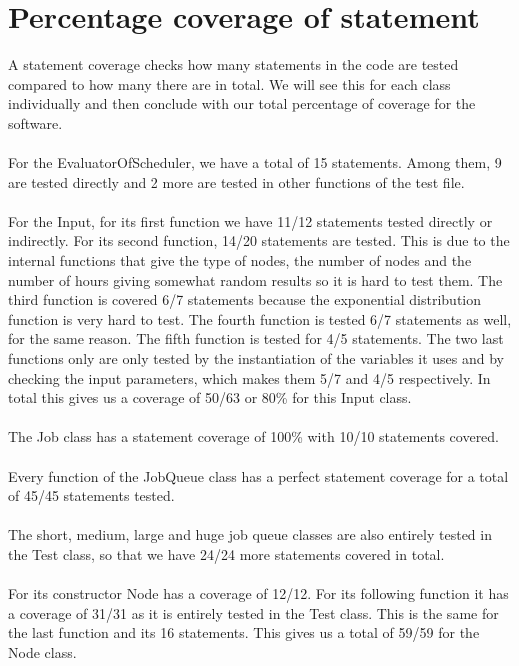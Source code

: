 \documentclass [10 pt, a4 paper]{report}
\begin{document}
\section{Percentage coverage of statement}

A statement coverage checks how many statements in the code are tested compared to how many there are in total. We will see this for each class individually and then conclude with our total percentage of coverage for the software. 
\\ \\
For the EvaluatorOfScheduler, we have a total of 15 statements. Among them, 9 are tested directly and 2 more are tested in other functions of the test file.
\\ \\
For the Input, for its first function we have 11/12 statements tested directly or indirectly. For its second function, 14/20 statements are tested. This is due to the internal functions that give the type of nodes, the number of nodes and the number of hours giving somewhat random results so it is hard to test them. The third function is covered 6/7 statements because the exponential distribution function is very hard to test. The fourth function is tested 6/7 statements as well, for the same reason. The fifth function is tested for 4/5 statements. The two last functions only are only tested by the instantiation of the variables it uses and by checking the input parameters, which makes them 5/7 and 4/5 respectively. In total this gives us a coverage of 50/63 or 80\% for this Input class.
\\ \\
The Job class has a statement coverage of 100\% with 10/10 statements covered.
\\ \\
Every function of the JobQueue class has a perfect statement coverage for a total of 45/45 statements tested.
\\ \\
The short, medium, large and huge job queue classes are also entirely tested in the Test class, so that we have 24/24 more statements covered in total.
\\ \\
For its constructor Node has a coverage of 12/12. For its following function it has a coverage of 31/31 as it is entirely tested in the Test class. This is the same for the last function and its 16 statements. This gives us a total of 59/59 for the Node class.
\\ \\
\end{document}
